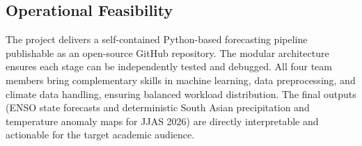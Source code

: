 \subsection{Operational Feasibility}

The project delivers a self-contained Python-based forecasting pipeline publishable as an open-source GitHub repository. The modular architecture ensures each stage can be independently tested and debugged. All four team members bring complementary skills in machine learning, data preprocessing, and climate data handling, ensuring balanced workload distribution. The final outputs (ENSO state forecasts and deterministic South Asian precipitation and temperature anomaly maps for JJAS 2026) are directly interpretable and actionable for the target academic audience.